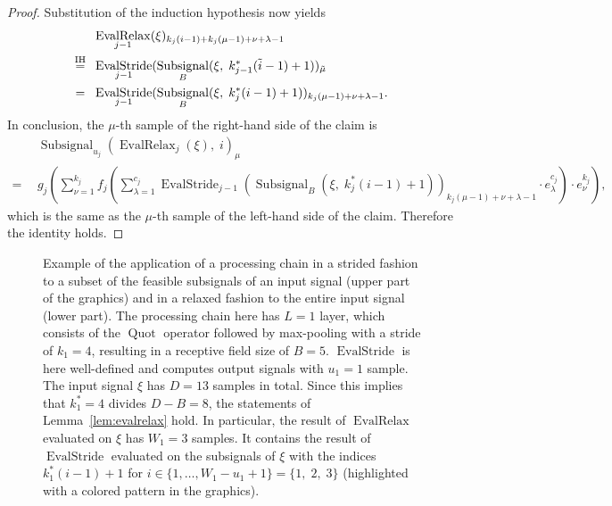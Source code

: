 \documentclass[journal]{IEEEtran}
\newcommand{\ROI}{B}
\newcommand{\discint}[2]{\{#1,\dotsc,#2\}}
\newcommand{\inint}[2]{\in\discint{#1}{#2}}
\DeclareMathOperator{\Subsignal}{Subsignal}
\DeclareMathOperator{\EvalStride}{EvalStride}
\newcommand{\equsing}[1]{\overset{\mathclap{\text{#1}}}{=}}
\DeclareMathOperator{\EvalRelax}{EvalRelax}
\begin{document}
\begin{proof}
Substitution of the induction hypothesis now yields
\begin{align*}
  & \EvalRelax_{j - 1}(\xi)_{k_j(i - 1) + k_j(\mu - 1) + \nu + \lambda - 1}\\
  \equsing{IH}\ \ & \EvalStride_{j - 1}(\Subsignal_\ROI(\xi,\; k_{j - 1}^*(\tilde{i} - 1) + 1))_{\tilde{\mu}}\\
  =\ \ & \EvalStride_{j - 1}(\Subsignal_\ROI(\xi,\; k_j^*(i - 1) + 1))_{k_j(\mu - 1) + \nu + \lambda - 1}\text{.}
\end{align*}
In conclusion, the $\mu$-th sample of the right-hand side of the claim is
\begin{align*}
  & \Subsignal_{u_j}(\EvalRelax_j(\xi),\; i)_\mu\\
  =\ \ & g_j\!\left( \sum\nolimits_{\nu = 1}^{k_j} f_j\!\left(\sum\nolimits_{\lambda = 1}^{c_j} \EvalStride_{j - 1}(\Subsignal_\ROI(\xi,\; k_j^*(i - 1) + 1))_{k_j(\mu - 1) + \nu + \lambda - 1}\cdot e_\lambda^{c_j}\right)\cdot e_\nu^{k_j} \right)\text{,}
\end{align*}
which is the same as the $\mu$-th sample of the left-hand side of the claim.
Therefore the identity holds.
\end{proof}\begin{figure}[p]
  \centering
  \caption{Example of the application of a processing chain in a strided fashion to a subset of the feasible subsignals of an input signal (upper part of the graphics) and in a relaxed fashion to the entire input signal (lower part).
    The processing chain here has $L = 1$ layer, which consists of the $\operatorname{Quot}$ operator followed by max-pooling with a stride of $k_1 = 4$, resulting in a receptive field size of $\ROI = 5$.
    $\EvalStride$ is here well-defined and computes output signals with $u_1 = 1$ sample.
    The input signal $\xi$ has $D = 13$ samples in total.
    Since this implies that $k_1^* = 4$ divides $D - \ROI = 8$, the statements of Lemma~\ref{lem:evalrelax} hold.
    In particular, the result of $\EvalRelax$ evaluated on $\xi$ has $W_1 = 3$ samples.
    It contains the result of $\EvalStride$ evaluated on the subsignals of $\xi$ with the indices $k_1^*(i - 1) + 1$ for $i\inint{1}{W_1 - u_1 + 1} = \{1,\;2,\;3\}$ (highlighted with a colored pattern in the graphics).}
  \label{fig:relaxed}
\end{figure}
\end{document}
